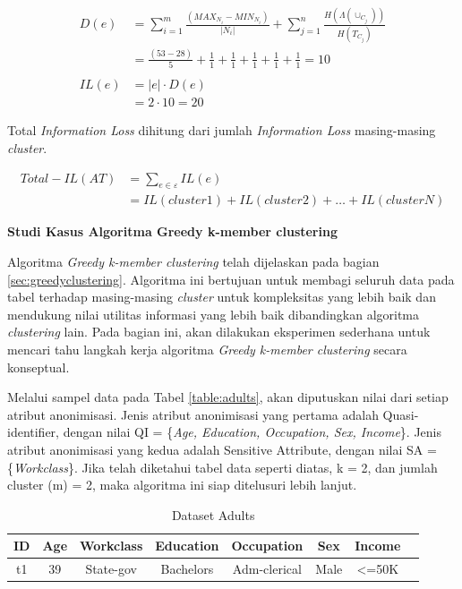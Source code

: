 \documentclass[a4paper,twoside]{article}
\begin{document}
\begin{enumerate}
\begin{enumerate}
\begin{align*}
D(e) &= \sum_{i=1}^{m} \frac{(MAX_{N_i} - MIN_{N_i})}{|N_i|} + \sum_{j=1}^{n}\frac{H(\Lambda(\cup_{C_j}))}{H(T_{C_j})}\\
&= \frac{(53 - 28)}{5} + \frac{1}{1}+\frac{1}{1}+\frac{1}{1}+\frac{1}{1}+\frac{1}{1} = 10\\\\
IL(e) &= |e| \cdot D(e)\\
&= 2 \cdot 10 = 20
\end{align*}

\noindent Total \textit{Information Loss} dihitung dari jumlah \textit{Information Loss} masing-masing \textit{cluster}.

\begin{align*}
Total-IL(AT) &= \sum_{e \in \varepsilon}^{}  IL(e)\\
&= IL(cluster1)+IL(cluster2)+\ldots+IL(clusterN)
\end{align*}

\end{enumerate}
		
\textbf{Studi Kasus Algoritma Greedy k-member clustering}

Algoritma \textit{Greedy k-member clustering} telah dijelaskan pada bagian \ref{sec:greedyclustering}. Algoritma ini bertujuan untuk membagi seluruh data pada tabel terhadap masing-masing \textit{cluster} untuk kompleksitas yang lebih baik dan mendukung nilai utilitas informasi yang lebih baik dibandingkan algoritma \textit{clustering} lain. Pada bagian ini, akan dilakukan eksperimen sederhana untuk mencari tahu langkah kerja algoritma \textit{Greedy k-member clustering} secara konseptual.

\par Melalui sampel data pada Tabel \ref{table:adults}, akan diputuskan nilai dari setiap atribut anonimisasi. Jenis atribut anonimisasi yang pertama adalah Quasi-identifier, dengan nilai QI = \{\textit{Age, Education, Occupation, Sex, Income}\}. Jenis atribut anonimisasi yang kedua adalah Sensitive Attribute, dengan nilai SA = \{\textit{Workclass}\}. Jika telah diketahui tabel data seperti diatas, k = 2, dan jumlah cluster (m) = 2, maka algoritma ini siap ditelusuri lebih lanjut.

\begin{table}[H]
\centering
\caption{Dataset Adults}
\begin{tabular}{c c c c c c c c}
\hline 
ID & Age & Workclass & Education & Occupation & Sex & Income\\ 
\hline 
t1 & 39 & State-gov & Bachelors & Adm-clerical & Male & <=50K \\ 


\end{tabular}
\end{table}
\end{enumerate}
\end{document}
